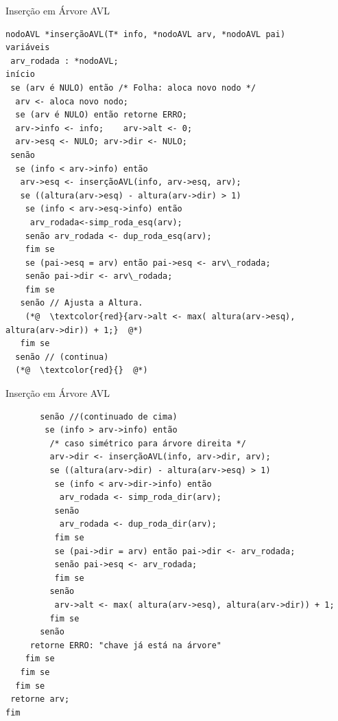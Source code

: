 \documentclass[12pt,table,xcolor={dvipsnames}]{beamer}
\begin{document}
\begin{frame}[fragile]{Inserção em Árvore AVL}
\begin{lstlisting}
nodoAVL *inserçãoAVL(T* info, *nodoAVL arv, *nodoAVL pai)
variáveis
 arv_rodada : *nodoAVL;
início
 se (arv é NULO) então /* Folha: aloca novo nodo */
  arv <- aloca novo nodo;
  se (arv é NULO) então retorne ERRO;
  arv->info <- info;	arv->alt <- 0;
  arv->esq <- NULO;	arv->dir <- NULO;
 senão
  se (info < arv->info) então
   arv->esq <- inserçãoAVL(info, arv->esq, arv);
   se ((altura(arv->esq) - altura(arv->dir) > 1)
    se (info < arv->esq->info) então 
     arv_rodada<-simp_roda_esq(arv);
    senão arv_rodada <- dup_roda_esq(arv);
    fim se 
    se (pai->esq = arv) então pai->esq <- arv\_rodada;
    senão pai->dir <- arv\_rodada;
    fim se
   senão // Ajusta a Altura.
    (*@  \textcolor{red}{arv->alt <- max( altura(arv->esq), altura(arv->dir)) + 1;}  @*)
   fim se
  senão // (continua)
  (*@  \textcolor{red}{}  @*)
\end{lstlisting}
\end{frame}

\begin{frame}[fragile]{Inserção em Árvore AVL}
\begin{lstlisting}
       senão //(continuado de cima)
        se (info > arv->info) então
         /* caso simétrico para árvore direita */
         arv->dir <- inserçãoAVL(info, arv->dir, arv);
         se ((altura(arv->dir) - altura(arv->esq) > 1)
          se (info < arv->dir->info) então
           arv_rodada <- simp_roda_dir(arv);
          senão
           arv_rodada <- dup_roda_dir(arv);
          fim se
          se (pai->dir = arv) então pai->dir <- arv_rodada;
          senão pai->esq <- arv_rodada;
          fim se
         senão
          arv->alt <- max( altura(arv->esq), altura(arv->dir)) + 1;
         fim se
       senão
     retorne ERRO: "chave já está na árvore"
    fim se
   fim se
  fim se
 retorne arv;
fim
\end{lstlisting}
\end{frame}
\end{document}
